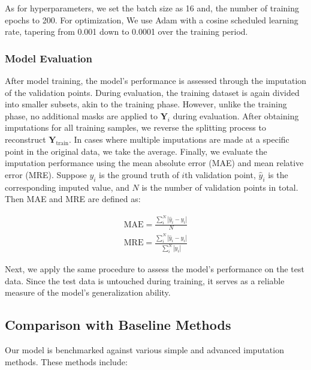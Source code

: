 \documentclass[11pt]{article}
\begin{document}
As for hyperparameters, we set the batch size as 16 and, the number of training epochs to 200. For optimization, We use Adam \citep{kingma2014adam} with a cosine scheduled learning rate, tapering from 0.001 down to 0.0001 over the training period.


\subsubsection*{Model Evaluation}
After model training, the model's performance is assessed through the imputation of the validation points. During evaluation, the training dataset is again divided into smaller subsets, akin to the training phase. However, unlike the training phase, no additional masks are applied to $\boldsymbol{Y}_i$ during evaluation. After obtaining imputations for all training samples, we reverse the splitting process to reconstruct $\boldsymbol{Y}_{\text{train}}$. In cases where multiple imputations are made at a specific point in the original data, we take the average. Finally, we evaluate the imputation performance using the mean absolute error (MAE) and mean relative error (MRE). Suppose $y_i$ is the ground truth of $i$th validation point, $\hat{y}_i$ is the corresponding imputed value, and $N$ is the number of validation points in total. Then MAE and MRE are defined as:


\begin{align}
		\text{MAE}=\frac{\sum_i^N |\hat{y}_i - y_i|}{N}\\
		\text{MRE}=\frac{\sum_i^N|\hat{y}_i-y_i|}{\sum_i^N|y_i|}
\end{align}


Next, we apply the same procedure to assess the model's performance on the test data. Since the test data is untouched during training, it serves as a reliable measure of the model's generalization ability.



\subsection{Comparison with Baseline Methods}
Our model is benchmarked against various simple and advanced imputation methods. These methods include:
\end{document}
